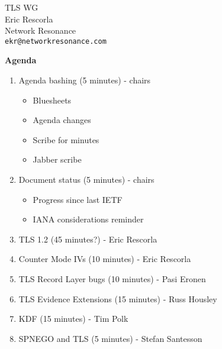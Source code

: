 \documentclass[fancybox]{seminar}
\newcommand{\heading}[1]{%
  \begin{center}
    \large\bf
    #1
  \end{center}
  \vspace{.4 in}}
\begin{document}
\begin{slide}
\begin{center}
\LARGE{{\bf}TLS WG}\\

\vspace{.3 in}
\large{Eric Rescorla}\\
\large{Network Resonance}\\
\large{\texttt{ekr@networkresonance.com}}

\end{center}
\end{slide}

\begin{slide}
\heading{Agenda}

{\tiny
\begin{enumerate}
\item Agenda bashing (5 minutes) - chairs
\begin{itemize}
\item Bluesheets
\item Agenda changes
\item Scribe for minutes
\item Jabber scribe
\end{itemize}
\item Document status (5 minutes) - chairs
\begin{itemize}
\item Progress since last IETF
\item IANA considerations reminder
\end{itemize}      
\item TLS 1.2 (45 minutes?) - Eric Rescorla
\item Counter Mode IVs (10 minutes) - Eric Rescorla
\item TLS Record Layer bugs (10 minutes) - Pasi Eronen
\item TLS Evidence Extensions (15 minutes) - Russ Housley
\item KDF (15 minutes) - Tim Polk
\item SPNEGO and TLS (5 minutes) - Stefan Santesson
\end{enumerate}
}

\end{slide}
\end{document}
